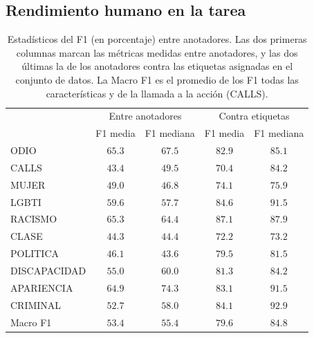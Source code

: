 \subsection{Rendimiento humano en la tarea}


\begin{table}
    \centering
    \begin{tabular}{l cc  cc}
                   & \multicolumn{2}{c}{Entre anotadores} & \multicolumn{2}{c}{Contra etiquetas} \\
        {}         &  F1 media &  F1 mediana  & F1 media  &  F1 mediana \\
        \hline
        ODIO       &  $65.3$ &   $67.5$    & $82.9$   &   $85.1$   \\
        CALLS      &  $43.4$ &   $49.5$   &  $70.4$   &   $84.2$  \\
        \hline
        MUJER      &  $49.0$ &   $46.8$   &  $74.1$   &   $75.9$  \\
        LGBTI      &  $59.6$ &   $57.7$   &  $84.6$   &   $91.5$  \\
        RACISMO    &  $65.3$ &   $64.4$   &  $87.1$   &   $87.9$  \\
        CLASE      &  $44.3$ &   $44.4$   &  $72.2$   &   $73.2$  \\
        POLITICA   &  $46.1$ &   $43.6$   &  $79.5$   &   $81.5$  \\
        DISCAPACIDAD& $55.0$ &   $60.0$   &  $81.3$   &   $84.2$  \\
        APARIENCIA &  $64.9$ &   $74.3$   &  $83.1$   &   $91.5$  \\
        CRIMINAL   &  $52.7$ &   $58.0$   &  $84.1$   &   $92.9$  \\
        \hline
        Macro F1   &  $53.4$ &   $55.4$   &  $79.6$   &   $84.8$  \\
        \hline
    \end{tabular}

    \caption{Estadísticos del F1 (en porcentaje) entre anotadores. Las dos primeras columnas marcan las métricas medidas entre anotadores, y las dos últimas la de los anotadores contra las etiquetas asignadas en el conjunto de datos. La Macro F1 es el promedio de los F1 todas las características y de la llamada a la acción (CALLS). }
    \label{tab:ia_f1_scores}
\end{table}



